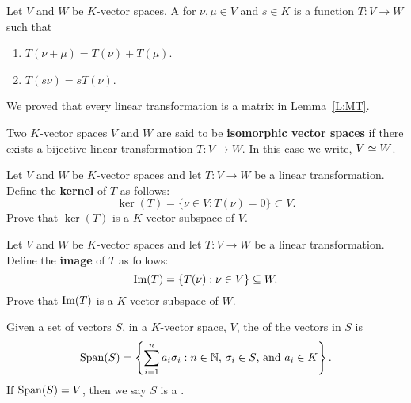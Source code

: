\documentclass{ximera}
\begin{document}
\begin{definition}
  Let $V$ and $W$ be $K$-vector spaces. A 
  for $\nu,\mu\in V$ and $s\in K$ is a function $T:V\to W$ such that
    \begin{enumerate}
    \item $T(\nu+\mu) = T(\nu)+T(\mu)$.
    \item $T(s \nu) = sT(\nu)$.
    \end{enumerate}
\end{definition}

\begin{remark}
  We proved that every linear transformation is a matrix in
  Lemma~\ref{L:MT}.
\end{remark}

\begin{definition}
  Two $K$-vector spaces $V$ and $W$ are said to be \textbf{isomorphic
    vector spaces} if there exists a bijective linear transformation
  $T:V\to W$. In this case we write, $V\simeq W$.
\end{definition}

\begin{exercise}
  Let $V$ and $W$ be $K$-vector spaces and let $T:V\to W$ be a linear
  transformation. Define the \textbf{kernel} of $T$ as follows:
  \[
  \ker(T) = \{\nu\in V: T(\nu) = 0\}\subset V.
  \]
  Prove that $\ker(T)$ is a $K$-vector subspace of $V$.
\end{exercise}

\begin{exercise}
  Let $V$ and $W$ be $K$-vector spaces and let $T:V\to W$ be a linear
  transformation. Define the \textbf{image} of $T$ as follows:
  \[
  \operatorname{Im}(T) = \{T(\nu): \nu\in V\}\subseteq W.
  \]
  Prove that $\operatorname{Im}(T)$ is a $K$-vector subspace of $W$.
\end{exercise}







\begin{definition}
  Given a set of vectors $S$, in a $K$-vector space, $V$, the
   of the vectors in $S$ is
  \[
  \operatorname{Span}(S) = \left\{\sum_{i=1}^n a_i\sigma_i:\text{$n\in \mathbb N$,
    $\sigma_i\in S$, and $a_i\in K$}\right\}.
  \]
  If $\operatorname{Span}(S) = V$, then we say $S$ is a .
\end{definition}
\end{document}
